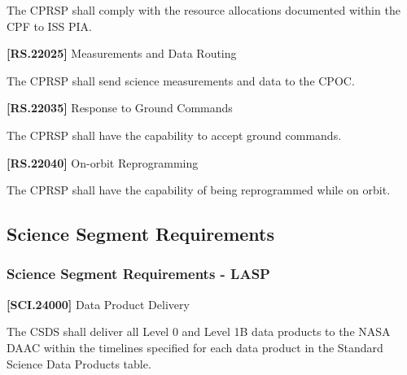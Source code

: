 \documentclass[12pt,oneside,oldfontcommands]{memoir}
\begin{document}
The \gls{CPRSP} shall comply with the resource allocations documented within the \gls{CPF} to \gls{ISS} \gls{PIA}.

\textbf{[RS.22025]} Measurements and Data Routing

The \gls{CPRSP} shall send science \gls{measure}ments and data to the \gls{CPOC}.

\textbf{[RS.22035]} Response to Ground Commands

The \gls{CPRSP} shall have the capability to accept ground commands.

\textbf{[RS.22040]} On-orbit Reprogramming

The \gls{CPRSP} shall have the capability of being reprogrammed while on orbit.

\subsection{Science Segment Requirements}
\label{sciencesegmentrequirements}

\subsubsection{Science Segment Requirements - LASP}
\label{sciencesegmentrequirements-lasp}

\textbf{[SCI.24000]} Data Product Delivery

The \gls{CSDS} shall deliver all Level 0 and Level 1B data products to the NASA \gls{DAAC} within the timelines specified for each data product in the Standard Science Data Products table.
\end{document}
